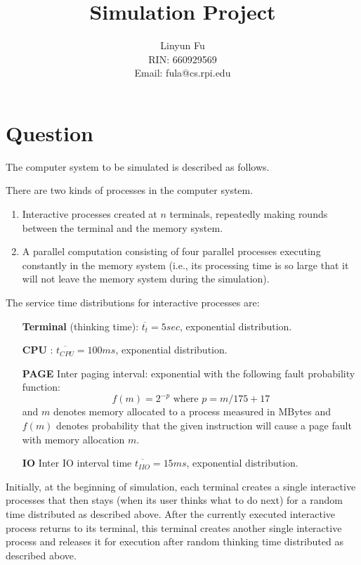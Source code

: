 \documentclass[12pt,letterpaper]{article}
\author{Linyun Fu\\RIN: 660929569\\Email: fula@cs.rpi.edu}
\title{Simulation Project}
\begin{document}
\maketitle
\part*{Question}
The computer system to be simulated is described as follows.

There are two kinds of processes in the computer system.
\begin{enumerate}
\item Interactive processes created at $n$ terminals, repeatedly making rounds between the
terminal and the memory system.
\item A parallel computation consisting of four parallel processes executing constantly in
the memory system (i.e., its processing time is so large that it will not leave the
memory system during the simulation).
\end{enumerate}

The service time distributions for interactive processes are:
\begin{itemize}
\item[\bf{Terminal}] (thinking time): $\overline{t_t} = 5sec$, exponential distribution.
\item[\bf{CPU}] : $\overline{t_{CPU}} = 100ms$, exponential distribution.
\item[\bf{PAGE}] Inter paging interval: exponential with the following fault probability function:
\begin{equation*}
f(m) = 2^{-p} \textrm{ where } p = m/175 + 17
\end{equation*}
and $m$ denotes memory allocated to a process measured in MBytes and $f(m)$ denotes
probability that the given instruction will cause a page fault with memory allocation
$m$.
\item[\bf{IO}] Inter IO interval time $\overline{t_{IIO}} = 15ms$, exponential distribution.
\end{itemize}
Initially, at the beginning of simulation, each terminal creates a single interactive processes
that then stays (when its user thinks what to do next) for a random time distributed as
described above. After the currently executed interactive process returns to its terminal,
this terminal creates another single interactive process and releases it for execution after
random thinking time distributed as described above.
\end{document}
